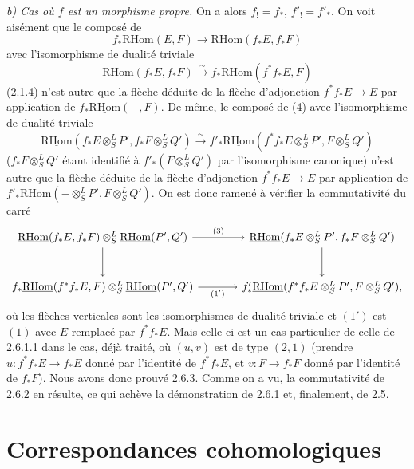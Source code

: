 \documentclass[11pt]{article}
\providecommand{\RHom}{\mathrm{RHom}}
\providecommand{\uRHom}{\underline{\RHom}}
\providecommand{\RHom}{\mathrm{RHom}}
\providecommand{\RHom}{\mathrm R\mathcal{H}om}
\providecommand{\RHom}{\mathrm{RHom}}
\begin{document}
\emph{b) Cas où $f$ est un morphisme propre.} On a alors $f_!=f_*$, $f'_!=f'_*$. On voit aisément que le composé de
\[
f_*\uRHom(E,F)\longrightarrow\uRHom(f_*E,f_*F)
\]
avec l'isomorphisme de dualité triviale
\[
\uRHom(f_*E,f_*F)\xrightarrow{\sim}f_*\uRHom(f^{*}f_*E,F)
\]
(2.1.4) n'est autre que la flèche déduite de la flèche d'adjonction $f^{*}f_*E\to E$ par application de $f_*\uRHom(-,F)$. De même, le composé de (4) avec l'isomorphisme de dualité triviale
\[
\uRHom(f_*E\otimes^L_SP',f_*F\otimes^L_SQ')\xrightarrow{\sim}f'_*\uRHom(f^{*}f_*E\otimes^L_SP',F\otimes^L_SQ')
\]
($f_*F\otimes^L_SQ'$ étant identifié à $f'_*(F\otimes^L_SQ')$ par l'isomorphisme canonique) n'est autre que la flèche déduite de la flèche d'adjonction $f^{*}f_*E\to E$ par application de $f'_*\uRHom(-\otimes^L_SP',F\otimes^L_SQ')$. On est donc ramené à vérifier la commutativité du carré
\[
\begin{tikzcd}[column sep=large,row sep=large]
\uRHom(f_*E,f_*F)\otimes^L_S\uRHom(P',Q') \arrow[r,"(3)"] \arrow[d] & \uRHom(f_*E\otimes^L_SP',f_*F\otimes^L_SQ') \arrow[d]\\
f_*\uRHom(f^{*}f_*E,F)\otimes^L_S\uRHom(P',Q') \arrow[r,"(1')"'] & f'_*\uRHom(f^{*}f_*E\otimes^L_SP',F\otimes^L_SQ'),
\end{tikzcd}
\]
où les flèches verticales sont les isomorphismes de dualité triviale et $(1')$ est $(1)$ avec $E$ remplacé par $f^{*}f_*E$. Mais celle-ci est un cas particulier de celle de 2.6.1.1 dans le cas, déjà traité, où $(u,v)$ est de type $(2,1)$ (prendre $u:f^{*}f_*E\to f_*E$ donné par l'identité de $f^{*}f_*E$, et $v:F\to f_*F$ donné par l'identité de $f_*F$). Nous avons donc prouvé 2.6.3. Comme on a vu, la commutativité de 2.6.2 en résulte, ce qui achève la démonstration de 2.6.1 et, finalement, de 2.5.

\clearpage
\section{Correspondances cohomologiques}
\end{document}
